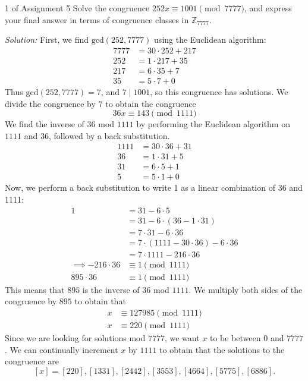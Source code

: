 \documentclass{eh-homework}
\begin{document}
    \begin{question}{1 of Assignment 5}
        Solve the congruence $252x \equiv 1001 \pmod{7777}$, and express your final answer in terms of congruence classes in $\mathbb{Z}_{7777}$.

        \medskip

        \textit{Solution:} First, we find \(\mathrm{gcd} (252, 7777)\) using the Euclidean algorithm:
        \begin{align*}
            7777 &= 30 \cdot 252 + 217 \\
            252 &= 1 \cdot 217 + 35 \\
            217 &= 6 \cdot 35 + 7 \\
            35 &=  5 \cdot 7 + 0
        \end{align*}
        Thus \(\mathrm{gcd} (252, 7777) = 7\), and \(7 \mid 1001\), so this congruence has solutions. We divide the congruence by \(7\) to obtain the congruence
        \[
            36x \equiv 143 \pmod {1111}
        \]
        We find the inverse of \(36\) mod \(1111\) by performing the Euclidean algorithm on \(1111\) and \(36\), followed by a back substitution.
        \begin{align*}
            1111 &= 30 \cdot 36 + 31 \\
            36 &= 1 \cdot 31 + 5 \\
            31 &= 6 \cdot 5 + 1 \\
            5 &= 5 \cdot 1 + 0
        \end{align*}
        Now, we perform a back substitution to write 1 as a linear combination of 36 and 1111:
        \begin{align*}
            1 &= 31 - 6\cdot5 \\
            &= 31 - 6 \cdot (36 - 1 \cdot 31) \\
            &= 7 \cdot 31 - 6 \cdot 36 \\
            &= 7 \cdot (1111 - 30\cdot 36) - 6 \cdot 36 \\
            &= 7 \cdot 1111 - 216 \cdot 36 \\
            \implies -216 \cdot 36 &\equiv 1 \pmod {1111} \\
            895 \cdot 36 &\equiv 1 \pmod{1111}
        \end{align*}
        This means that \(895\) is the inverse of \(36\) mod \(1111\). We multiply both sides of the congruence by \(895\) to obtain that
        \begin{align*}
            x &\equiv 127985 \pmod{1111} \\
            x &\equiv 220 \pmod{1111}
        \end{align*}
        Since we are looking for solutions mod \(7777\), we want \(x\) to be between \(0\) and \(7777\). We can continually increment \(x\) by \(1111\) to obtain that the solutions to the congruence are
        \[[x] = [220], [1331], [2442], [3553], [4664], [5775], [6886].\]
    \end{question}
\end{document}
